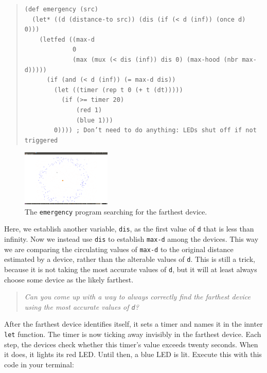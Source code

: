 \documentclass{article}
\newcommand\problem[1]{\begin{quote}{\em #1}\end{quote}}
\newcommand\var[1]{{\tt #1}}
\begin{document}
\begin{quote}
\begin{verbatim}
(def emergency (src) 
  (let* ((d (distance-to src)) (dis (if (< d (inf)) (once d) 0))) 
    (letfed ((max-d 
             0 
             (max (mux (< dis (inf)) dis 0) (max-hood (nbr max-d)))))
      (if (and (< d (inf)) (= max-d dis))
        (let ((timer (rep t 0 (+ t (dt)))))
          (if (>= timer 20) 
              (red 1) 
              (blue 1)))
        0)))) ; Don’t need to do anything: LEDs shut off if not triggered
\end{verbatim}
\end{quote}

\begin{figure}
  \includegraphics[width=0.38\textwidth]{figures/emergency.png}
  \caption{The \var{emergency} program searching for the farthest device.}
  \vspace{-0.5cm}
  \label{f:emergency}
\end{figure}

Here, we establish another variable, \var{dis}, as the first value of
\var{d} that is less than infinity.  Now we instead use \var{dis} to
establish \var{max-d} among the devices.  This way we are comparing
the circulating values of \var{max-d} to the original distance
estimated by a device, rather than the alterable values of \var{d}.
This is still a trick, because it is not taking the most accurate
values of \var{d}, but it will at least always choose some device as
the likely farthest.

\problem{Can you come up with a way to always correctly find the
  farthest device using the most accurate values of \var{d}?}

After the farthest device identifies itself, it sets a timer and names
it in the innter \var{let} function.  The timer is now ticking away
invisibly in the farthest device.  Each step, the devices check
whether this timer's value exceeds twenty seconds.  When it does, it
lights its red LED.  Until then, a blue LED is lit. Execute this with
this code in your terminal:
\end{document}
